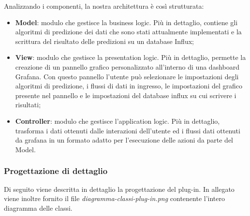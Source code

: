 Analizzando i componenti, la nostra architettura è così strutturata: 
\begin{itemize}
	\item \textbf{Model}: modulo che gestisce la business logic\glo. Più in dettaglio, contiene gli algoritmi di predizione dei dati che sono stati attualmente implementati e la scrittura del risultato delle predizioni su un database Influx;
	\item \textbf{View}: modulo che gestisce la presentation logic. Più in dettaglio, permette la creazione di un pannello grafico personalizzato all'interno di una dashboard Grafana\glo. Con questo pannello l'utente può selezionare le impostazioni degli algoritmi di predizione, i flussi di dati in ingresso, le impostazioni del grafico presente nel pannello e le impostazioni del database influx su cui scrivere i risultati;
	\item \textbf{Controller}: modulo che gestisce l'application logic. Più in dettaglio, trasforma i dati ottenuti dalle interazioni dell'utente ed i flussi dati ottenuti da grafana in un formato adatto per l'esecuzione delle azioni da parte del Model.
\end{itemize}
\subsubsection{Progettazione di dettaglio}
Di seguito viene descritta in dettaglio la progettazione del plug-in. In allegato viene inoltre fornito il file \textit{diagramma-classi-plug-in.png} contenente l'intero diagramma delle classi.
